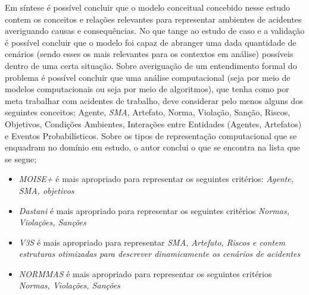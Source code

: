 Em síntese é possível concluir que o modelo conceitual concebido nesse estudo contem os conceitos e relações relevantes para representar ambientes de acidentes averiguando causas e consequências. No que tange ao estudo de caso e a validação é possível concluir que o modelo foi capaz de abranger uma dada quantidade de cenários (sendo esses os mais relevantes para os contextos em análise) possíveis dentro de uma certa situação. Sobre averiguação de um entendimento formal do problema é possível concluir que uma análise computacional (seja por meio de modelos computacionais ou seja por meio de algoritmos), que tenha como por meta trabalhar com acidentes de trabalho, deve considerar pelo menos alguns dos seguintes conceitos; Agente, \textit{SMA}, Artefato, Norma, Violação, Sanção, Riscos, Objetivos, Condições Ambientes, Interações entre Entidades (Agentes, Artefatos) e Eventos Probabilísticos. Sobre os tipos de representação computacional que se enquadram no domínio em estudo, o autor conclui o que se encontra na lista que se segue;
\begin{itemize}
    \item \textit{MOISE+} é mais apropriado para representar os seguintes critérios: \textit{Agente, SMA, objetivos}
    \item \textit{Dastani} é mais apropriado para representar os seguintes critérios \textit{Normas, Violações, Sanções} 
    \item \textit{V3S} é mais apropriado para representar \textit{SMA, Artefato, Riscos e contem estruturas otimizadas para descrever dinamicamente os cenários de acidentes}
    \item \textit{NORMMAS} é mais apropriado para representar os seguintes critérios \textit{Normas, Violações, Sanções}
\end{itemize}